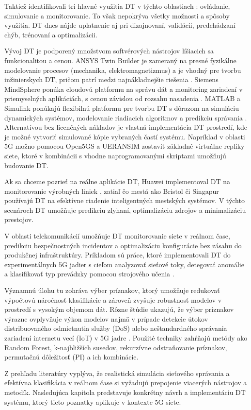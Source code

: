 Taktiež identifikovali tri hlavné využitia DT v týchto oblastiach \cite{AplicationsOfDT}: ovládanie, simulovanie a monitorovanie. To však nepokrýva všetky možnosti a spôsoby využitia. DT dnes nájde uplatnenie aj pri dizajnovaní, validácii, predchádzaní chýb, trénovaní a optimalizácii.

Vývoj DT je podporený množstvom softvérových nástrojov líšiacich sa funkcionalitou a cenou. ANSYS Twin Builder je zameraný na presné fyzikálne modelovanie procesov (mechanika, elektromagnetizmus) a je vhodný pre tvorbu inžinierskych DT, pričom patrí medzi najnákladnejšie riešenia \cite{ansys_twin_builder}. Siemens MindSphere ponúka cloudovú platformu na správu dát a monitoring zariadení v priemyselných aplikáciách, s cenou závislou od rozsahu nasadenia \cite{siemens_mindsphere}. MATLAB a Simulink ponúkajú flexibilnú platformu pre tvorbu DT s dôrazom na simuláciu dynamických systémov, modelovanie riadiacich algoritmov a predikciu správania \cite{mathworks_digital_twin}.
Alternatívou bez licenčných nákladov je vlastná implementácia DT prostredí, kde je možné vytvoriť simulované kópie vybraných častí systému. Napríklad v oblasti 5G možno pomocou Open5GS a UERANSIM zostaviť základné virtuálne repliky siete, ktoré v kombinácii s vhodne naprogramovanými skriptami umožňujú budovanie DT.

Ak sa chceme pozrieť na reálne aplikácie DT, Huawei implementoval DT na monitorovanie výrobných liniek \cite{huawei2020}, zatiaľ čo mestá ako Bristol \cite{Bristol} či Singapur \cite{singapur} používajú DT na efektívne riadenie inteligentných mestských systémov. V týchto scenároch DT umožňuje predikciu zlyhaní, optimalizáciu zdrojov a minimalizáciu prestojov. 

V oblasti telekomunikácií umožňuje DT monitorovanie siete v reálnom čase, predikciu bezpečnostných incidentov a optimalizáciu konfigurácie bez zásahu do produkčnej infraštruktúry. Príkladom sú práce, ktoré implementovali DT do experimentálnych 5G jadier s cieľom analyzovať sieťové toky, detegovať anomálie a klasifikovať typ prevádzky pomocou strojového učenia \cite{DTof5G}.

Významnú úlohu tu zohráva výber príznakov, ktorý umožňuje redukovať výpočtovú náročnosť klasifikácie a zároveň zvyšuje robustnosť modelov v prostredí s vysokým objemom dát. Rôzne štúdie ukazujú, že výber príznakov výrazne ovplyvňuje výkon modelov najmä v prípade detekcie útokov distribuovaného odmietnutia služby (DoS) alebo neštandardného správania zariadení internetu vecí (IoT) v 5G jadre \cite{EffectiveFS}. Použité techniky zahŕňajú metódy ako Random Forest, k-najbližších susedov, rekurzívne odstraňovanie príznakov, permutačnú dôležitosť (PI) a ich kombinácie.

Z prehľadu literatúry vyplýva, že realistická simulácia sieťového správania a efektívna klasifikácia v reálnom čase si vyžadujú prepojenie viacerých nástrojov a metodík. Nasledujúca kapitola predstavuje konkrétny návrh a implementáciu DT systému, ktorý tieto poznatky aplikuje v kontexte 5G siete.

